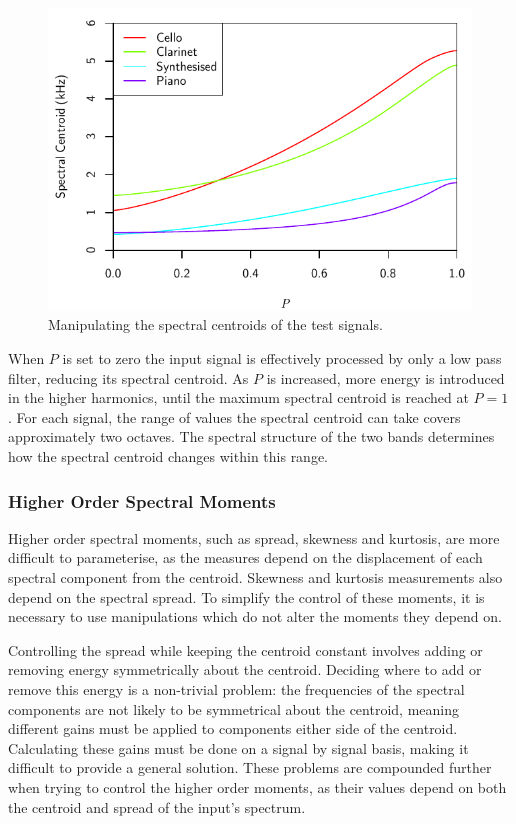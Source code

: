 			\begin{figure}[h!]
				\centering
				\includegraphics{chapter6/Images/MoveCentroids.pdf}
				\caption{Manipulating the spectral centroids of the test signals.}
				\label{fig:MoveCentroids}
			\end{figure}

			When $P$ is set to zero the input signal is effectively processed by only a low pass filter,
			reducing its spectral centroid. As $P$ is increased, more energy is introduced in the higher
			harmonics, until the maximum spectral centroid is reached at $P = 1$. For each signal, the range of
			values the spectral centroid can take covers approximately two octaves. The spectral structure of
			the two bands determines how the spectral centroid changes within this range.

		\subsubsection*{Higher Order Spectral Moments}
			Higher order spectral moments, such as spread, skewness and kurtosis, are more difficult to
			parameterise, as the measures depend on the displacement of each spectral component from the
			centroid. Skewness and kurtosis measurements also depend on the spectral spread. To simplify the
			control of these moments, it is necessary to use manipulations which do not alter the moments they
			depend on. 
			
			Controlling the spread while keeping the centroid constant involves adding or removing energy
			symmetrically about the centroid. Deciding where to add or remove this energy is a non-trivial
			problem: the frequencies of the spectral components are not likely to be symmetrical about the
			centroid, meaning different gains must be applied to components either side of the centroid.
			Calculating these gains must be done on a signal by signal basis, making it difficult to provide a
			general solution. These problems are compounded further when trying to control the higher order
			moments, as their values depend on both the centroid and spread of the input's spectrum.

